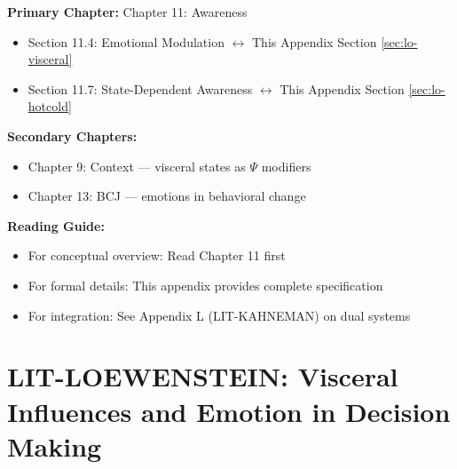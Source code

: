 \begin{tcolorbox}[colback=purple!5!white, colframe=purple!75!black,
    title=Chapter Linkage]

\textbf{Primary Chapter:} Chapter 11: Awareness
\begin{itemize}[nosep]
\item Section 11.4: Emotional Modulation $\leftrightarrow$ This Appendix Section \ref{sec:lo-visceral}
\item Section 11.7: State-Dependent Awareness $\leftrightarrow$ This Appendix Section \ref{sec:lo-hotcold}
\end{itemize}

\textbf{Secondary Chapters:}
\begin{itemize}[nosep]
\item Chapter 9: Context --- visceral states as $\Psi$ modifiers
\item Chapter 13: BCJ --- emotions in behavioral change
\end{itemize}

\textbf{Reading Guide:}
\begin{itemize}[nosep]
\item For conceptual overview: Read Chapter 11 first
\item For formal details: This appendix provides complete specification
\item For integration: See Appendix L (LIT-KAHNEMAN) on dual systems
\end{itemize}

\end{tcolorbox}


\chapter{LIT-LOEWENSTEIN: Visceral Influences and Emotion in Decision Making}
\label{app:lit-loewenstein}


\begin{abstract}
This appendix integrates George Loewenstein's research program into the EBF framework.
Loewenstein's work establishes that: (1) visceral states (hunger, pain, arousal, emotions)
systematically override cognitive preferences; (2) people in ``cold'' states cannot
accurately predict their behavior in ``hot'' states (hot-cold empathy gap); (3) curiosity
arises from information gaps; (4) anticipation generates utility independent of consumption.
His contributions fundamentally reshape how EBF models the Awareness function $A(\cdot)$
and Context $\Psi$. 29 papers spanning 1987-2016 are integrated, with 93\% providing
Tier-1 evidence.
\end{abstract}


